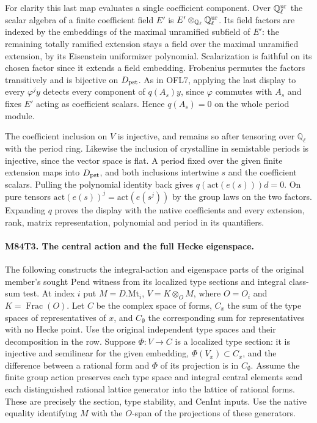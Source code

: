For clarity this last map evaluates a single coefficient component.
Over $\mathbb Q_\ell^{\rm ur}$ the scalar algebra of a finite
coefficient field $E'$ is $E'\otimes_{\mathbb Q_\ell}
\mathbb Q_\ell^{\rm ur}$. Its field factors are indexed by the
embeddings of the maximal unramified subfield of $E'$: the remaining
totally ramified extension stays a field over the maximal unramified
extension, by its Eisenstein uniformizer polynomial. Scalarization
is faithful on its chosen factor since it extends a field embedding.
Frobenius permutes the factors transitively and is bijective on
$D_{\rm pst}$. As in OFL7, applying the last display to every
$\varphi^j y$ detects every component of $q(A_s)y$, since
$\varphi$ commutes with $A_s$ and fixes $E'$ acting as coefficient
scalars. Hence $q(A_s)=0$ on the whole period module.

The coefficient inclusion on $V$ is injective, and remains so
after tensoring over $\mathbb Q_\ell$ with the period ring.
Likewise the inclusion of crystalline in semistable periods is
injective, since the vector space is flat. A period fixed over
the given finite extension maps into $D_{\rm pst}$, and both
inclusions intertwine $s$ and the coefficient scalars. Pulling the
polynomial identity back gives $q(\mathrm{act}(e(s)))d=0$.
On pure tensors $\mathrm{act}(e(s))^j=\mathrm{act}(e(s^j))$
by the group laws on the two factors. Expanding $q$ proves the
display with the native coefficients and every extension, rank,
matrix representation, polynomial and period in its quantifiers.

\paragraph{M84T3. The central action and the full Hecke eigenspace.}
The following constructs the integral-action and eigenspace parts of
the original member's sought $\mathrm{Pend}$ witness from its
localized type sections and integral class-sum test. At index $i$
put $M=D.\mathrm{Mt}_i$, $V=K\otimes_O M$, where $O=O_i$ and
$K=\operatorname{Frac}(O)$. Let $C$ be the complex space of forms,
$C_x$ the sum of the type spaces of representatives of $x$, and
$C_\emptyset$ the corresponding sum for representatives with no
Hecke point. Use the original independent type spaces and their
decomposition in the row. Suppose $\Phi:V\to C$ is a localized
type section: it is injective and semilinear for the given
embedding, $\Phi(V_x)\subset C_x$, and the difference between a
rational form and $\Phi$ of its projection is in $C_\emptyset$.
Assume the finite group action preserves each type space and
integral central elements send each distinguished rational lattice
generator into the lattice of rational forms. These are precisely
the section, type stability, and $\mathrm{CenInt}$ inputs. Use
the native equality identifying $M$ with the $O$-span of the
projections of these generators.

